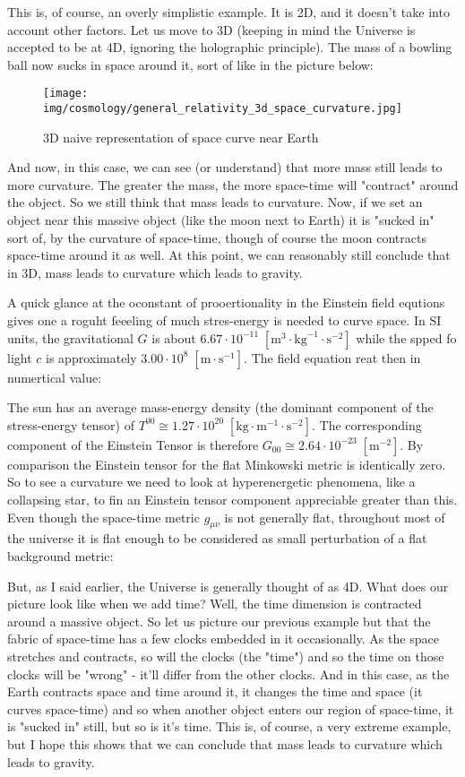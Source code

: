 	This is, of course, an overly simplistic example. It is 2D, and it doesn't take into account other factors. Let us move to 3D (keeping in mind the Universe is accepted to be at 4D, ignoring the holographic principle). The mass of a bowling ball now sucks in space around it, sort of like in the picture below:
	\begin{figure}[H]
		\centering
		\texttt{[image: img/cosmology/general\_relativity\_3d\_space\_curvature.jpg]}	
		\caption{3D naive representation of space curve near Earth}
	\end{figure}
	And now, in this case, we can see (or understand) that more mass still leads to more curvature. The greater the mass, the more space-time will "contract" around the object. So we still think that mass leads to curvature. Now, if we set an object near this massive object (like the moon next to Earth) it is "sucked in" sort of, by the curvature of space-time, though of course the moon contracts space-time around it as well. At this point, we can reasonably still conclude that in 3D, mass leads to curvature which leads to gravity.
	
	A quick glance at the oconstant of prooertionality in the Einstein field equtions gives one a roguht feeeling of much stres-energy is needed to curve space. In SI units, the gravitational $G$ is about $6.67\cdot 10^{-11}\;[\text{m}^3\cdot\text{kg}^{-1}\cdot\text{s}^{-2}]$ while the spped fo light $c$ is approximately $3.00\cdot 10^8\;[\text{m}\cdot \text{s}^{-1}]$. The field equation reat then in numertical value:
	
	The sun has an average mass-energy density (the dominant component of the stress-energy tensor) of $T^{00}\cong 1.27\cdot 10^{20}\;[\text{kg}\cdot\text{m}^{-1}\cdot\text{s}^{-2}]$. The corresponding component of the Einstein Tensor is therefore $G_{00}\cong 2.64\cdot 10^{-23}\;[\text{m}^{-2}]$. By comparison the Einstein tensor for the flat Minkowski metric is identically zero. So to see a curvature we need to look at hyperenergetic phenomena, like a collapsing star, to fin an Einstein tensor component appreciable greater than this. Even though the space-time metric $g_{\mu\nu}$ is not generally flat, throughout most of the universe it is flat enough to be considered as small perturbation of a flat background metric:
	
	But, as I said earlier, the Universe is generally thought of as 4D. What does our picture look like when we add time? Well, the time dimension is contracted around a massive object. So let us picture our previous example but that the fabric of space-time has a few clocks embedded in it occasionally. As the space stretches and contracts, so will the clocks (the "time") and so the time on those clocks will be "wrong" - it'll differ from the other clocks. And in this case, as the Earth contracts space and time around it, it changes the time and space (it curves space-time) and so when another object enters our region of space-time, it is "sucked in" still, but so is it's time. This is, of course, a very extreme example, but I hope this shows that we can conclude that mass leads to curvature which leads to gravity. 
	
